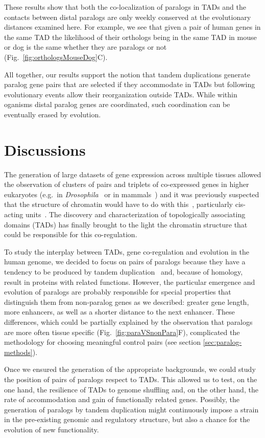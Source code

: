 \documentclass[a4paper,twoside=true,openright,parskip=full,chapterprefix=true,11pt,headings=normal,bibliography=totoc,listof=totoc,titlepage=on,captions=tableabove,draft=false]{scrreprt}
\theoremstyle{definition}
\theoremstyle{definition}
\theoremstyle{definition}
\theoremstyle{remark}
\begin{document}
These results show that both the co-localization of paralogs in TADs and
the contacts between distal paralogs are only weekly conserved at the
evolutionary distances examined here. For example, we see that given a
pair of human genes in the same TAD the likelihood of their orthologs
being in the same TAD in mouse or dog is the same whether they are
paralogs or not (Fig.~\ref{fig:orthologsMouseDog}C).

All together, our results support the notion that tandem duplications
generate paralog gene pairs that are selected if they accommodate in
TADs but following evolutionary events allow their reorganization
outside TADs. While within oganisms distal paralog genes are
coordinated, such coordination can be eventually erased by evolution.

\hypertarget{discussions}{%
\section{Discussions}\label{discussions}}

The generation of large datasets of gene expression across multiple
tissues allowed the observation of clusters of pairs and triplets of
co-expressed genes in higher eukaryotes (e.g.~in
\emph{Drosophila}~\citep{Boutanaev2002} or in
mammals~\citep{Purmann2007}) and it was previously suspected that the
structure of chromatin would have to do with this~\citep{Sproul2005},
particularly cis-acting units~\citep{Purmann2007}. The discovery and
characterization of topologically associating domains (TADs) has finally
brought to the light the chromatin structure that could be responsible
for this co-regulation.

To study the interplay between TADs, gene co-regulation and evolution in
the human genome, we decided to focus on pairs of paralogs because they
have a tendency to be produced by tandem duplication~\citep{Newman2015}
and, because of homology, result in proteins with related functions.
However, the particular emergence and evolution of paralogs are probably
responsible for special properties that distinguish them from
non-paralog genes as we described: greater gene length, more enhancers,
as well as a shorter distance to the next enhancer. These differences,
which could be partially explained by the observation that paralogs are
more often tissue specific (Fig.~\ref{fig:paraVSnonPara}F), complicated
the methodology for choosing meaningful control pairs (see section
\ref{sec:paralog-methods}).

Once we ensured the generation of the appropriate backgrounds, we could
study the position of pairs of paralogs respect to TADs. This allowed us
to test, on the one hand, the resilience of TADs to genome shuffling
and, on the other hand, the rate of accommodation and gain of
functionally related genes. Possibly, the generation of paralogs by
tandem duplication might continuously impose a strain in the
pre-existing genomic and regulatory structure, but also a chance for the
evolution of new functionality.
\end{document}

